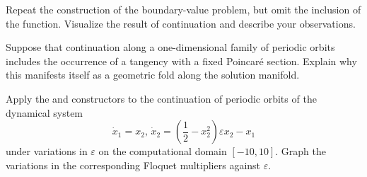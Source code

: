 \begin{exercises}
\item Repeat the construction of the boundary-value problem, but omit the inclusion of the  function. Visualize the result of continuation and describe your observations.
\item Suppose that continuation along a one-dimensional family of periodic orbits includes the occurrence of a tangency with a fixed Poincar\'{e} section. Explain why this manifests itself as a geometric fold along the solution manifold.
\item Apply the  and  constructors to the continuation of periodic orbits of the dynamical system
\[
\dot{x}_1=x_2,\,\dot{x}_2=\left(\frac{1}{2}-x_2^2\right)\varepsilon x_2-x_1
\]
under variations in $\varepsilon$ on the computational domain $[-10,10]$. Graph the variations in the corresponding Floquet multipliers against $\varepsilon$.
\end{exercises}

